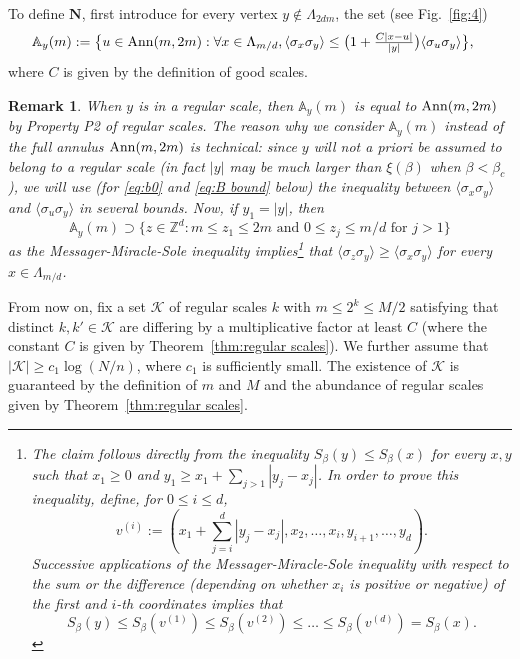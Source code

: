 \documentclass[a4paper,oneside,11pt]{article}
\def\Z{\mathbb{Z}}                          %
\newtheorem{remark}[theorem]{Remark}
\newcommand{\be}[1]{\begin{equation}\label{#1}}
\newcommand{\ee}{\end{equation}}
\numberwithin{equation}{section}
\numberwithin{equation}{section}
\numberwithin{equation}{section}
\newcommand{\calK}{\mathcal{K}}
\newcommand{\bbA}{\mathbb{A}}
\def\Z{\mathbb{Z}}                          %
\def\be{\begin{equation}}
\def\ee{\end{equation}}
\begin{document}
To define $\mathbf N$, first introduce for every vertex $y\notin \Lambda_{2dm}$,  the set (see Fig.~\ref{fig:4}) 
\begin{align}
\bbA_{y}(m)&:=\big\{u\in {\rm Ann}(m,2m):\forall x\in \Lambda_{m/d}, \langle\sigma_x\sigma_y\rangle \le \big(1+\tfrac{C|x-u|}{|y|}\big)\langle\sigma_u\sigma_y\rangle\big\},
\end{align}
where $C$ is given by the definition of good scales.
\begin{remark}\label{rmk:aa} When $y$ is in a regular scale, then $\bbA_{y}(m)$ is equal to ${\rm Ann}(m,2m)$ by Property P2 of regular scales. The reason why we  consider $\bbA_{y}(m)$ instead of the full annulus ${\rm Ann}(m,2m)$ is technical: since $y$ will not a priori be assumed to belong to a regular scale (in fact $|y|$ may be much larger than $\xi(\beta)$ when $\beta<\beta_c$), we will use (for \eqref{eq:b0} and \eqref{eq:B bound} below) the inequality between $\langle\sigma_x\sigma_y\rangle$ and $\langle\sigma_u\sigma_y\rangle$ in several bounds. Now,  if $y_1=|y|$, then
\be\label{eq:aah1}
\bbA_{y}(m)\supset\{z\in\Z^d: m\le z_1\le 2m\text{ and }0\le z_j\le m/d\text{ for $j>1$}\}\ee
as the Messager-Miracle-Sole inequality implies\footnote{
The claim follows directly from the inequality $S_\beta(y)\le S_\beta(x)$ for every $x,y$ such that $x_1\ge0$ and  $y_1\ge x_1+\sum_{j>1}|y_j-x_j|$. In order to prove this inequality, define, for $0\le i\le d$,
\be
v^{(i)}:=(x_1+\sum_{j=i}^d|y_j-x_j|,x_2,\dots,x_{i},y_{i+1},\dots,y_d).
\ee
Successive applications of the Messager-Miracle-Sole inequality  with respect to the sum or the difference (depending on whether $x_i$ is positive or negative) of the first and $i$-th coordinates implies that 
\be
S_\beta(y)\le S_\beta(v^{(1)})\le S_\beta(v^{(2)})\le\dots\le S_\beta(v^{(d)})=S_\beta(x).
\ee
} that $\langle\sigma_z\sigma_y\rangle\ge \langle\sigma_x\sigma_y\rangle$ for every $x\in \Lambda_{m/d}$.
\end{remark}
From now on, fix a set $\calK$ of regular scales $k$ with $m\le 2^k\le M/2$ satisfying that distinct $k,k'\in \calK$ are differing by a multiplicative factor at least $C$ (where the constant $C$ is given by Theorem~\ref{thm:regular scales}). We further assume that $|\calK|\ge c_1\log(N/n)$, where $c_1$ is sufficiently small. The existence of $\calK$ is guaranteed by the definition of $m$ and $M$ and the abundance of regular scales given by Theorem~\ref{thm:regular scales}.
 
\end{document}
